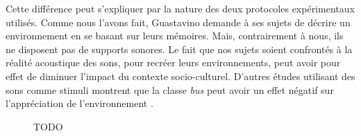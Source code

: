 Cette différence peut s'expliquer par la nature des deux protocoles expérimentaux utilisés. Comme nous l'avons fait, Guastavino demande à ses sujets de décrire un environnement en se basant sur leurs mémoires. Mais, contrairement à nous, ils ne disposent pas de supports sonores. Le fait que nos sujets soient confrontés à la réalité acoustique des sons, pour recréer leurs environnements, peut avoir pour effet de diminuer l'impact du contexte socio-culturel. D'autres études utilisant des sons comme stimuli montrent que la classe \emph{bus} peut avoir un effet négatif sur l'appréciation de l'environnement \citep{lavandier2006contribution}.

\begin{figure}[t]
        \myfloatalign
         \par
       \caption[TODO]{TODO}\label{fig:soundsource}
\end{figure}

